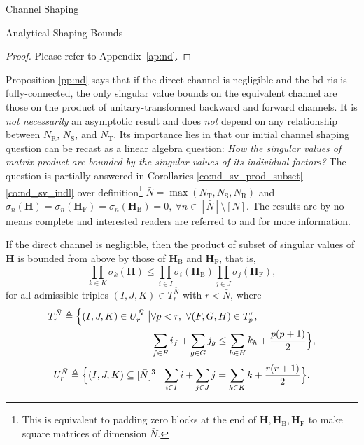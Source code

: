 \documentclass[journal]{IEEEtran}
\begin{document}
\begin{section}{Channel Shaping}
\begin{subsection}{Analytical Shaping Bounds}
		\begin{proof}
			Please refer to Appendix~\ref{ap:nd}.
		\end{proof}

		Proposition \ref{pp:nd} says that if the direct channel is negligible and the \gls{bd}-\gls{ris} is fully-connected, the only singular value bounds on the equivalent channel are those on the product of unitary-transformed backward and forward channels.
		It is \emph{not necessarily} an asymptotic result and does \emph{not} depend on any relationship between $N_\mathrm{R}$, $N_\mathrm{S}$, and $N_\mathrm{T}$.
		Its importance lies in that our initial channel shaping question can be recast as a linear algebra question: \emph{How the singular values of matrix product are bounded by the singular values of its individual factors?}
		The question is partially answered in Corollaries \ref{co:nd_sv_prod_subset} -- \ref{co:nd_sv_indl} over definition\footnote{This is equivalent to padding zero blocks at the end of $\mathbf{H}, \mathbf{H}_\mathrm{B}, \mathbf{H}_\mathrm{F}$ to make square matrices of dimension $\bar{N}$.} $\bar{N} = \max(N_\mathrm{T},N_\mathrm{S},N_\mathrm{R})$ and $\sigma_n(\mathbf{H})=\sigma_n(\mathbf{H}_\mathrm{F})=\sigma_n(\mathbf{H}_\mathrm{B})=0, \ \forall n \in [\bar{N}] \setminus [N]$.
		The results are by no means complete and interested readers are referred to \cite[Chapter 16, 24]{Hogben2013} and \cite[Chapter 3]{Horn1994} for more information.


		\begin{corollary}
			\label{co:nd_sv_prod_subset}
			If the direct channel is negligible,
			then the product of subset of singular values of $\mathbf{H}$ is bounded from above by those of $\mathbf{H}_\mathrm{B}$ and $\mathbf{H}_\mathrm{F}$, that is,
			\begin{equation}
				\label{iq:horn}
				\prod_{k \in {K}} \sigma_k(\mathbf{H}) \le \prod_{i \in {I}} \sigma_i(\mathbf{H}_\mathrm{B}) \prod_{j \in {J}} \sigma_j(\mathbf{H}_\mathrm{F}),
			\end{equation}
			for all admissible triples $(I, J, K) \in T_r^{\bar{N}}$ with $r < \bar{N}$, where
			\begin{equation*}
				\begin{split}
					T_r^{\bar{N}} \triangleq \Bigl\{(I, J, K) \in U_r^{\bar{N}} \bigm\vert & \forall p < r, \ \forall (F, G, H) \in T_p^r,                                              \\
																							& \sum_{f \in F} i_f + \sum_{g \in G} j_g \le \sum_{h \in H} k_h + \frac{p(p+1)}{2} \Bigr\},
				\end{split}
			\end{equation*}
			\begin{equation*}
				U_r^{\bar{N}} \triangleq \Bigl\{(I, J, K) \subseteq [\bar{N}]^3 \bigm\vert \sum_{i \in I} i + \sum_{j \in J} j = \sum_{k \in K} k + \frac{r(r+1)}{2}\Bigr\}.
			\end{equation*}
		\end{corollary}


\end{subsection}
\end{section}
\end{document}
